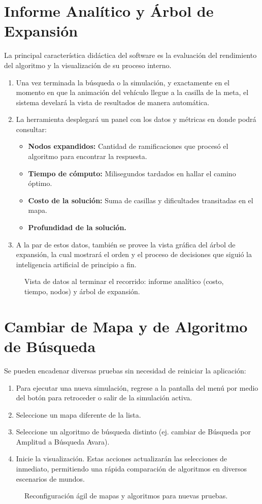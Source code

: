 \documentclass[12pt]{article}
\begin{document}
\section{Informe Analítico y Árbol de Expansión}
La principal característica didáctica del software es la evaluación del rendimiento del algoritmo y la visualización de su proceso interno.
\begin{enumerate}
    \item Una vez terminada la búsqueda o la simulación, y exactamente en el momento en que la animación del vehículo llegue a la casilla de la meta, el sistema develará la vista de resultados de manera automática.
    \item La herramienta desplegará un panel con los datos y métricas en donde podrá consultar:
    \begin{itemize}
        \item \textbf{Nodos expandidos:} Cantidad de ramificaciones que procesó el algoritmo para encontrar la respuesta.
        \item \textbf{Tiempo de cómputo:} Milisegundos tardados en hallar el camino óptimo.
        \item \textbf{Costo de la solución:} Suma de casillas y dificultades transitadas en el mapa.
        \item \textbf{Profundidad de la solución.}
    \end{itemize}
    \item A la par de estos datos, también se provee la vista gráfica del árbol de expansión, la cual mostrará el orden y el proceso de decisiones que siguió la inteligencia artificial de principio a fin.
\end{enumerate}

\begin{figure}[h!]
    \centering
    \vspace{6cm} %
    \caption{Vista de datos al terminar el recorrido: informe analítico (costo, tiempo, nodos) y árbol de expansión.}
\end{figure}

\section{Cambiar de Mapa y de Algoritmo de Búsqueda}
Se pueden encadenar diversas pruebas sin necesidad de reiniciar la aplicación:
\begin{enumerate}
    \item Para ejecutar una nueva simulación, regrese a la pantalla del menú por medio del botón para retroceder o salir de la simulación activa.
    \item Seleccione un mapa diferente de la lista.
    \item Seleccione un algoritmo de búsqueda distinto (ej. cambiar de Búsqueda por Amplitud a Búsqueda Avara).
    \item Inicie la visualización. Estas acciones actualizarán las selecciones de inmediato, permitiendo una rápida comparación de algoritmos en diversos escenarios de mundos.
\end{enumerate}

\begin{figure}[h!]
    \centering
    \vspace{6cm} %
    \caption{Reconfiguración ágil de mapas y algoritmos para nuevas pruebas.}
\end{figure}
\end{document}
